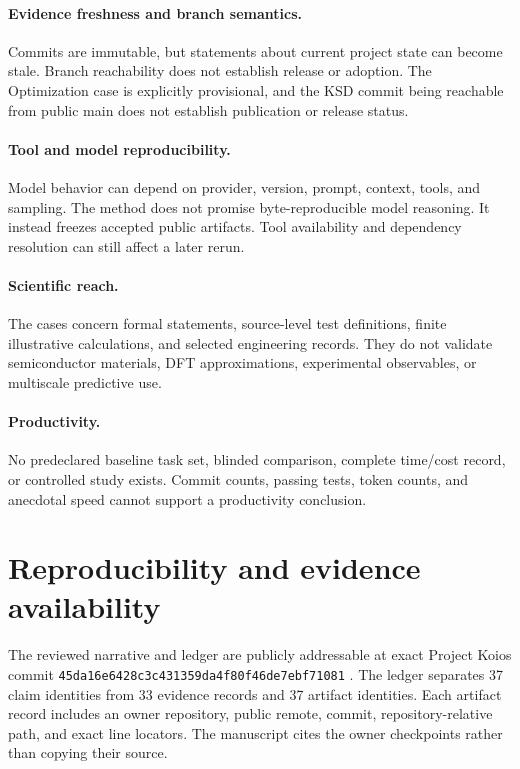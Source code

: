 \documentclass[11pt]{article}
\begin{document}
\paragraph{Evidence freshness and branch semantics.}
Commits are immutable, but statements about current project state can become
stale. Branch reachability does not establish release or adoption. The
Optimization case is explicitly provisional, and the KSD commit being reachable
from public main does not establish publication or release status.

\paragraph{Tool and model reproducibility.}
Model behavior can depend on provider, version, prompt, context, tools, and
sampling. The method does not promise byte-reproducible model reasoning. It
instead freezes accepted public artifacts. Tool availability and dependency
resolution can still affect a later rerun.

\paragraph{Scientific reach.}
The cases concern formal statements, source-level test definitions, finite
illustrative calculations, and selected engineering records. They do not
validate semiconductor materials, DFT approximations, experimental observables,
or multiscale predictive use.

\paragraph{Productivity.}
No predeclared baseline task set, blinded comparison, complete time/cost record,
or controlled study exists. Commit counts, passing tests, token counts, and
anecdotal speed cannot support a productivity conclusion.

\section{Reproducibility and evidence availability}
\label{sec:reproducibility}

The reviewed narrative and ledger are publicly addressable at exact Project
Koios commit \texttt{45da16e6428c3c431359da4f80f46de7ebf71081}
\citep{projectkoios_report_2026,projectkoios_ledger_2026}. The ledger separates
37 claim identities from 33 evidence records and 37 artifact identities. Each
artifact record includes an owner repository, public remote, commit,
repository-relative path, and exact line locators. The manuscript cites the
owner checkpoints rather than copying their source.
\end{document}
